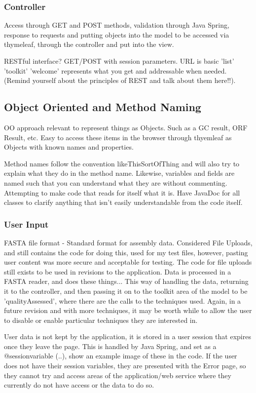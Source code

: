 \subsubsection{Controller}
Access through GET and POST methods, validation through Java Spring, response to requests and putting objects into the model to be accessed via thymeleaf, through the controller and put into the view. 

RESTful interface? GET/POST with session parameters. URL is basic 'list' 'toolkit' 'welcome' represents what you get and addressable when needed. (Remind yourself about the principles of REST and talk about them here!!).

\subsection{Object Oriented and Method Naming}
OO approach relevant to represent things as Objects. Such as a GC result, ORF Result, etc. Easy to access these items in the browser through thyemleaf as Objects with known names and properties.

Method names follow the convention likeThisSortOfThing and will also try to explain what they do in the method name. Likewise, variables and fields are named such that you can understand what they are without commenting. Attempting to make code that reads for itself what it is. Have JavaDoc for all classes to clarify anything that isn't easily understandable from the code itself.

\subsubsection{User Input}
FASTA file format - Standard format for assembly data.
Considered File Uploads, and still contains the code for doing this, used for my test files, however, pasting user content was more secure and acceptable for testing. The code for file uploads still exists to be used in revisions to the application.
Data is processed in a FASTA reader, and does these things...
This way of handling the data, returning it to the controller, and then passing it on to the toolkit area of the model to be 'qualityAssessed', where there are the calls to the techniques used. Again, in a future revision and with more techniques, it may be worth while to allow the user to disable or enable particular techniques they are interested in.

User data is not kept by the application, it is stored in a user session that expires once they leave the page. This is handled by Java Spring, and set as a @sessionvariable (..), show an example image of these in the code. If the user does not have their session variables, they are presented with the Error page, so they cannot try and access areas of the application/web service where they currently do not have access or the data to do so.

